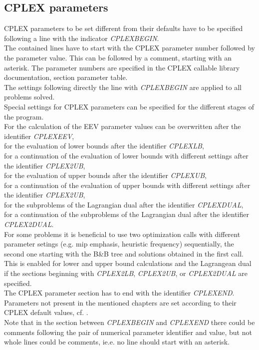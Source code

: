 \documentclass[11pt,draft]{article}
\newcommand{\+}{{\ti{+}}}
\newcommand{\1}{{\ti{1}}}
\begin{document}
\subsection{CPLEX parameters}
CPLEX parameters to be set different from their defaults have to be specified following a line with the indicator {\it CPLEXBEGIN}.\\
The contained lines have to start with the CPLEX parameter number followed by the parameter value. This can be followed by a comment, starting with an asterisk.
The parameter numbers are specified in the CPLEX callable library documentation, section parameter table.\\
The settings following directly the line with {\it CPLEXBEGIN} are applied to all problems solved.\\[0.5em]
Special settings for CPLEX parameters can be specified for the different stages of the program.\\
For the calculation of the EEV
parameter values can be overwritten after the identifier {\it CPLEXEEV},\\
for the evaluation of lower bounds after the identifier {\it CPLEXLB},\\
for a continuation of the evaluation of lower bounds with different settings after the identifier {\it CPLEX2UB},\\
for the evaluation of upper bounds after the identifier {\it CPLEXUB},\\
for a continuation of the evaluation of upper bounds with different settings after the identifier {\it CPLEX2UB},\\
for the subproblems of the Lagrangian dual after the identifier {\it CPLEXDUAL},\\
for a continuation of the subproblems of the Lagrangian dual after the identifier {\it CPLEX2DUAL}.\\[0.5em]
For some problems it is beneficial to use two optimization calls with different parameter setings (e.g. mip emphasis, heuristic frequency)
sequentially, the second one starting with the B\&B tree and solutions obtained in the first call. This is enabled for lower and upper bound calculations and the Lagrangean dual if the sections beginning 
with {\it CPLEX2LB}, {\it CPLEX2UB}, or  {\it CPLEX2DUAL} are specified.\\[0.5em]
The CPLEX parameter section has to end with the identifier {\it CPLEXEND}.
Parameters not present in the mentioned chapters are set according to their CPLEX default values,
cf. \cite{cp}. \\
Note that in the section between {\it CPLEXBEGIN} and  {\it CPLEXEND} there could be comments following the pair of numerical parameter identifier and value, but not whole lines could be comments, ie.e. 
no line should start with an asterisk.
\end{document}
